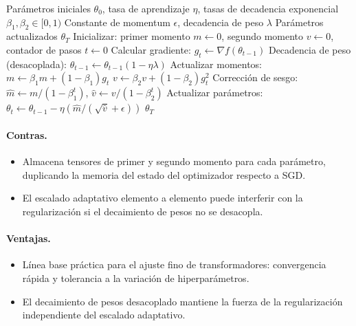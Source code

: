 \begin{algorithm}[H]
\caption{AdamW (Adam con Decadencia de Peso Desacoplada)}
\label{alg:adamw}
\begin{algorithmic}[1]
\Require Parámetros iniciales $\theta_0$, tasa de aprendizaje $\eta$, tasas de decadencia exponencial $\beta_1, \beta_2 \in [0,1)$
\Require Constante de momentum $\epsilon$, decadencia de peso $\lambda$
\Ensure Parámetros actualizados $\theta_T$
\State Inicializar: primer momento $m \gets 0$, segundo momento $v \gets 0$, contador de pasos $t \gets 0$
    \State Calcular gradiente: $g_t \gets \nabla f(\theta_{t-1})$
    \State Decadencia de peso (desacoplada): $\theta_{t-1} \gets \theta_{t-1}(1 - \eta\lambda)$
    \State Actualizar momentos: $m \gets \beta_1 m + (1-\beta_1) g_t$
    \State $v \gets \beta_2 v + (1-\beta_2) g_t^2$
    \State Corrección de sesgo: $\hat{m} \gets m / (1 - \beta_1^t)$, $\hat{v} \gets v / (1 - \beta_2^t)$
    \State Actualizar parámetros: $\theta_t \gets \theta_{t-1} - \eta (\hat{m} / (\sqrt{\hat{v}} + \epsilon))$
\EndFor
\Return $\theta_T$
\end{algorithmic}
\end{algorithm}

\paragraph{Contras.}
\begin{itemize}[leftmargin=*]
\item Almacena tensores de primer y segundo momento para cada parámetro, duplicando la memoria del estado del optimizador respecto a SGD.
\item El escalado adaptativo elemento a elemento puede interferir con la regularización si el decaimiento de pesos no se desacopla.
\end{itemize}

\paragraph{Ventajas.}
\begin{itemize}[leftmargin=*]
\item Línea base práctica para el ajuste fino de transformadores: convergencia rápida y tolerancia a la variación de hiperparámetros.
\item El decaimiento de pesos desacoplado mantiene la fuerza de la regularización independiente del escalado adaptativo.
\end{itemize}

